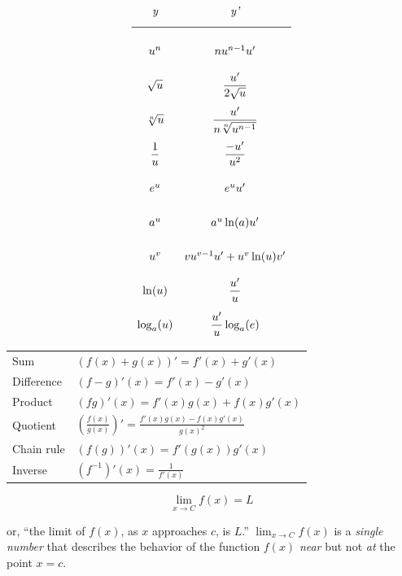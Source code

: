
\begin{center}
\[
\def\arraystretch{2.5}
 \begin{array}{cc}
  \textit{y}   &      \textit{y'}               \\
  \midrule
  u^n          & nu^{n-1}u'                     \\
  \sqrt{u}     & \dfrac{u'}{2\sqrt{u}}          \\
  \sqrt[n]{u}  & \dfrac{u'}{n\sqrt[n]{u^{n-1}}} \\
  \dfrac{1}{u} & \dfrac{-u'}{u^2}               \\
  e^u          & e^u u'                         \\
  a^u          & a^u\ln(a)u'                    \\
  u^v          & vu^{v-1}u'+u^v\ln(u) v'        \\
  \ln(u)        & \dfrac{u'}{u}                 \\
  \log_a(u)    & \dfrac{u'}{u}\log_a(e)
 \end{array}
\]
\end{center}
\hformbar




\begin{center}
  \begin{tabular}{ll}
  Sum         & $(f(x)+g(x))' = f'(x) + g'(x)$    \\
  Difference  & $(f-g)'(x) = f'(x) - g'(x)$        \\
  Product     & $(fg)'(x) = f'(x)g(x) + f(x)g'(x)$ \\
  Quotient    & $ \left(\frac{f(x)}{g(x)}\right)' = \frac{f'(x)g(x) - f(x)g'(x)}{g(x)^2}$ \\
  Chain rule  & $(f(g))'(x) = f'(g(x))g'(x)$        \\
  Inverse     & $(f^{-1})'(x) = \frac{1}{f'(x)}$  
  \end{tabular}
\end{center}
\hformbar







\begin{equation}
    \lim_{x \rightarrow C} f(x) = L
\end{equation}

or, ``the limit of $f(x)$, as $x$ approaches $c$, is $L$.'' $\lim_{x \rightarrow C} f(x)$ is a \textit{single number} that describes the behavior of the function $f(x)$ \textit{near} but not \textit{at} the point $x = c$.

